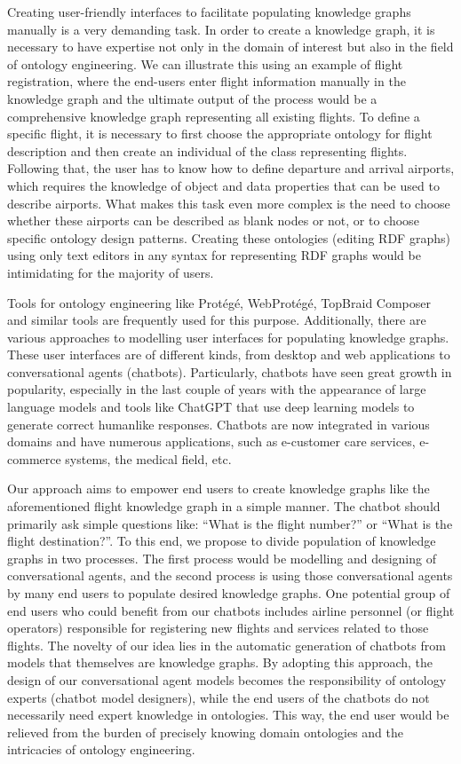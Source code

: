 \documentclass[runningheads]{llncs}
\begin{document}
Creating user-friendly interfaces to facilitate populating knowledge graphs manually is a very demanding task. In order to create a knowledge graph, it is necessary to have expertise not only in the domain of interest but also in the field of ontology engineering. We can illustrate this using an example of flight registration, where the end-users enter flight information manually in the knowledge graph and  the ultimate output of the process would be a comprehensive knowledge graph representing all existing flights. To define a specific flight, it is necessary to first choose the appropriate ontology for flight description and then create an individual of the class representing flights. Following that, the user has to know how to define departure and arrival airports, which requires the knowledge of object and data properties that can be used to describe airports. What makes this task even more complex is the need to choose whether these airports can be described as blank nodes or not, or to choose specific ontology design patterns. Creating these ontologies (editing RDF graphs) using only text editors in any syntax for representing RDF graphs would be intimidating for the majority of users.

Tools for ontology engineering like Protégé, WebProtégé, TopBraid Composer and similar tools are frequently used for this purpose. Additionally, there are various approaches to modelling user interfaces for populating knowledge graphs. These user interfaces are of different kinds, from desktop and web applications to conversational agents (chatbots). Particularly, chatbots have seen great growth in popularity, especially in the last couple of years with the appearance of large language models and tools like ChatGPT that use deep learning models to generate correct humanlike responses. Chatbots are now integrated in various domains and have numerous applications, such as e-customer care services, e-commerce systems, the medical field, etc.

Our approach aims to empower end users to create knowledge graphs like the aforementioned flight knowledge graph in a simple manner. The chatbot should primarily ask simple questions like: ``What is the flight number?'' or ``What is the flight destination?''. To this end, we propose to divide population of knowledge graphs in two processes. The first process would be modelling and designing of conversational agents, and the second process is using those conversational agents by many end users to populate desired knowledge graphs. One potential group of end users who could benefit from our chatbots includes airline personnel (or flight operators) responsible for registering new flights and services related to those flights. The novelty of our idea lies in the automatic generation of chatbots from models that themselves are knowledge graphs. By adopting this approach, the design of our conversational agent models becomes the responsibility of ontology experts (chatbot model designers),  while the end users of the chatbots do not necessarily need expert knowledge in ontologies. This way, the end user would be relieved from the burden of precisely knowing domain ontologies and the intricacies of ontology engineering.
\end{document}
